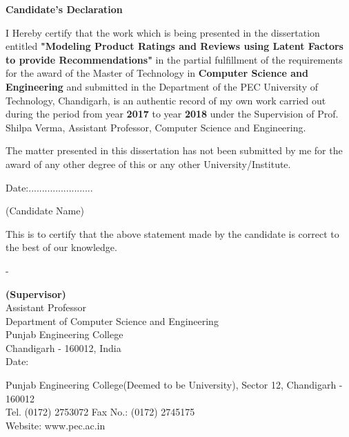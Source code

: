 \documentclass[a4paper]{article}
\begin{document}
\vspace*{5px}
    \begin{figure}[h]
        {\par}
    \end{figure}
\justify
\begin{large}
\begin{center}
\textbf{Candidate's Declaration}
\end{center}


I Hereby  certify  that  the  work  which  is  being  presented  in  the dissertation entitled \textbf{"Modeling Product Ratings and Reviews using Latent Factors to provide Recommendations"} in  the partial fulfillment of the requirements for the award of the Master of Technology in \textbf{Computer Science and Engineering} and submitted in the Department of the PEC University of Technology, Chandigarh, is  an  authentic record of my own work carried out during the period from year \textbf{2017} to year \textbf{2018} under the Supervision of Prof. Shilpa Verma, Assistant Professor, Computer Science and Engineering. \par
The  matter  presented  in  this dissertation has  not  been  submitted  by  me  for  the  award  of  any other degree of this or any other University/Institute. \par


\begin{minipage}{0.5\textwidth}
Date:........................
\end{minipage}%
\begin{minipage}{0.5\textwidth}
(Candidate Name)
\end{minipage}

This  is  to  certify  that  the  above  statement  made  by  the  candidate  is  correct  to  the  best  of  our knowledge.

\begin{minipage}{0.5\textwidth}
-
\end{minipage}%
\begin{minipage}{0.5\textwidth}
\textbf{(Supervisor)}\\
Assistant Professor\\
Department of Computer Science and Engineering\\
Punjab Engineering College\\
Chandigarh - 160012, India\\
Date: 
\end{minipage}

\vfill


\begin{center}
{\color{gray}
Punjab Engineering College(Deemed to be University), Sector 12, Chandigarh - 160012\\
Tel. (0172) 2753072 Fax No.: (0172) 2745175\\
Website: www.pec.ac.in}
\end{center}


\end{large}
\end{document}
